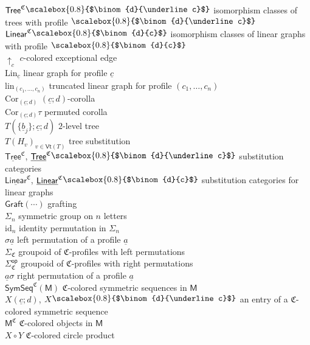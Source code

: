 \documentclass{amsbook}
\numberwithin{section}{chapter}
\numberwithin{subsection}{section}
\numberwithin{equation}{section}
\theoremstyle{plain}
\theoremstyle{definition}
\newcommand{\colorc}{\mathfrak{C}}
\newcommand{\Cor}{\mathrm{Cor}}
\newcommand{\graft}{\mathsf{Graft}}
\newcommand{\Lin}{\mathrm{Lin}}
\newcommand{\lin}{\mathrm{lin}}
\newcommand{\Vt}{\mathsf{Vt}}
\newcommand{\op}{\mathsf{op}}
\newcommand{\M}{\mathsf{M}}
\newcommand{\id}{\mathrm{id}}
\newcommand{\Linear}{\mathsf{Linear}}
\newcommand{\uLinear}{\underline{\Linear}}
\newcommand{\Linearc}{\Linear^{\colorc}}
\newcommand{\uLinearc}{\uLinear^{\colorc}}
\newcommand{\Tree}{\mathsf{Tree}}
\newcommand{\uTree}{\underline{\Tree}}
\newcommand{\Treec}{\Tree^{\colorc}}
\newcommand{\uTreec}{\uTree^{\colorc}}
\newcommand{\Sigmaop}{\Sigma^{\op}}
\newcommand{\Sigmac}{\Sigma_{\colorc}}
\newcommand{\Sigmacop}{\Sigmaop_{\colorc}}
\newcommand{\symseq}{\mathsf{SymSeq}}
\newcommand{\symseqcm}{\symseq^{\colorc}(\M)}
\newcommand{\ua}{\underline a}
\newcommand{\ub}{\underline b}
\newcommand{\uc}{\underline c}
\newcommand{\smallprof}[1]
{\raisebox{.05cm}{\scalebox{0.8}{#1}}}
\newcommand{\dc}{\smallprof{$\binom{d}{c}$}}
\newcommand{\duc}{\smallprof{$\binom{d}{\uc}$}}
\begin{document}
\begin{tabbing}
$\Treec\duc$  isomorphism classes of trees with profile $\duc$\\
$\Linearc\dc$  isomorphism classes of linear graphs with profile $\dc$\\
$\uparrow_c$  $c$-colored exceptional edge\\
$\Lin_{\uc}$  linear graph for profile $\uc$\\
$\lin_{(c_1,\ldots,c_n)}$  truncated linear graph for profile $(c_1,\ldots,c_n)$\\
$\Cor_{(\uc;d)}$  $(\uc;d)$-corolla\\
$\Cor_{(\uc;d)}\tau$  permuted corolla\\
$T\left(\{\ub_j\};\uc;d\right)$  $2$-level tree\\
$T(H_v)_{v\in \Vt(T)}$  tree substitution\\
$\uTreec$, $\uTreec\duc$  substitution categories\\
$\uLinearc$, $\uLinearc\dc$  substitution categories for linear graphs\\
$\graft(\cdots)$  grafting\\
$\Sigma_n$  symmetric group on $n$ letters\\
$\id_n$  identity permutation in $\Sigma_n$\\
$\sigma\ua$  left permutation of a profile $\ua$\\
$\Sigmac$  groupoid of $\colorc$-profiles with left permutations\\
$\Sigmacop$  groupoid of $\colorc$-profiles with right permutations\\
$\ua\sigma$  right permutation of a profile $\ua$\\
$\symseqcm$  $\colorc$-colored symmetric sequences in $\M$\\
$X(\uc;d)$, $X\duc$  an entry of a $\colorc$-colored symmetric sequence\\
$\M^{\colorc}$  $\colorc$-colored objects in $\M$\\
$X \circ Y$  $\colorc$-colored circle product\\

\end{tabbing}
\end{document}

